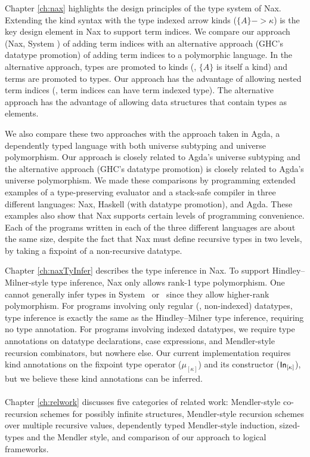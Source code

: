 Chapter \ref{ch:nax} highlights the design principles of the type system of Nax.
Extending the kind syntax with the type indexed arrow kinds ($\{A\} -> \kappa$) 
is the key design element in Nax to support term indices.
We compare our approach (Nax, System \Fi) of adding term indices with
an alternative approach (GHC's datatype promotion) of adding
term indices to a polymorphic language. In the alternative approach,
types are promoted to kinds (\ie, $\{A\}$ is itself a kind) and
terms are promoted to types. Our approach has the advantage of
allowing nested term indices (\ie, term indices can have term indexed type).
The alternative approach has the advantage of allowing data structures that
contain types as elements.

We also compare these two approaches with the approach taken in Agda,
a dependently typed language with both universe subtyping and
universe polymorphism. Our approach is closely related to
Agda's universe subtyping and the alternative approach
(GHC's datatype promotion) is closely related to Agda's universe polymorphism.
We made these comparisons by programming extended examples of
a type-preserving evaluator and a stack-safe compiler
in three different languages: Nax, Haskell (with datatype promotion), and Agda.
These examples also show that Nax supports certain levels of
programming convenience. Each of the programs written
in each of the three different languages are about the same size,
despite the fact that Nax must define recursive types in two levels,
by taking a fixpoint of a non-recursive datatype.

Chapter \ref{ch:naxTyInfer} describes the type inference in Nax. To support
Hindley--Milner-style type inference, Nax only allows rank-1 type polymorphism.
One cannot generally infer types in System \Fi\ or \Fixi\ since they allow
higher-rank polymorphism. For programs involving only regular (\ie, non-indexed)
datatypes, type inference is exactly the same as the Hindley--Milner
type inference, requiring no type annotation. For programs involving
indexed datatypes, we require type annotations on datatype declarations,
case expressions, and Mendler-style recursion combinators, but nowhere else.
Our current implementation requires kind annotations on
the fixpoint type operator ($\mu_{[\kappa]}$) and its constructor
($\mathsf{In}_{[\kappa]}$), but we believe these kind annotations can be inferred.

\paragraph{}
Chapter \ref{ch:relwork} discusses five categories of related work:
Mendler-style co-recursion schemes for possibly infinite structures,
Mendler-style recursion schemes over multiple recursive values,
dependently typed Mendler-style induction, sized-types and the Mendler style,
and comparison of our approach to logical frameworks.

